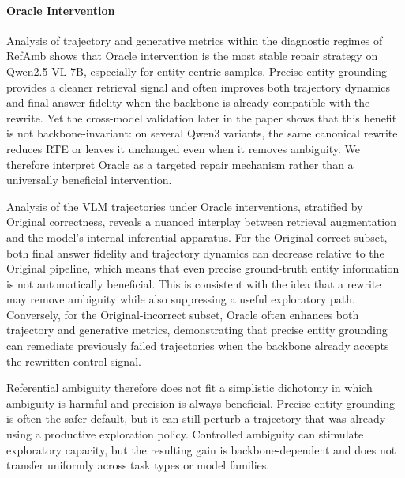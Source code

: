\documentclass{article} %
\begin{document}
\paragraph{Oracle Intervention} 
Analysis of trajectory and generative metrics within the diagnostic regimes of RefAmb shows that Oracle intervention is the most stable repair strategy on Qwen2.5-VL-7B, especially for entity-centric samples.
Precise entity grounding provides a cleaner retrieval signal and often improves both trajectory dynamics and final answer fidelity when the backbone is already compatible with the rewrite.
Yet the cross-model validation later in the paper shows that this benefit is not backbone-invariant: on several Qwen3 variants, the same canonical rewrite reduces RTE or leaves it unchanged even when it removes ambiguity.
We therefore interpret Oracle as a targeted repair mechanism rather than a universally beneficial intervention.

Analysis of the VLM trajectories under Oracle interventions, stratified by Original correctness, reveals a nuanced interplay between retrieval augmentation and the model’s internal inferential apparatus.
For the Original-correct subset, both final answer fidelity and trajectory dynamics can decrease relative to the Original pipeline, which means that even precise ground-truth entity information is not automatically beneficial.
This is consistent with the idea that a rewrite may remove ambiguity while also suppressing a useful exploratory path.
Conversely, for the Original-incorrect subset, Oracle often enhances both trajectory and generative metrics, demonstrating that precise entity grounding can remediate previously failed trajectories when the backbone already accepts the rewritten control signal.

Referential ambiguity therefore does not fit a simplistic dichotomy in which ambiguity is harmful and precision is always beneficial.
Precise entity grounding is often the safer default, but it can still perturb a trajectory that was already using a productive exploration policy.
Controlled ambiguity can stimulate exploratory capacity, but the resulting gain is backbone-dependent and does not transfer uniformly across task types or model families.
\end{document}
